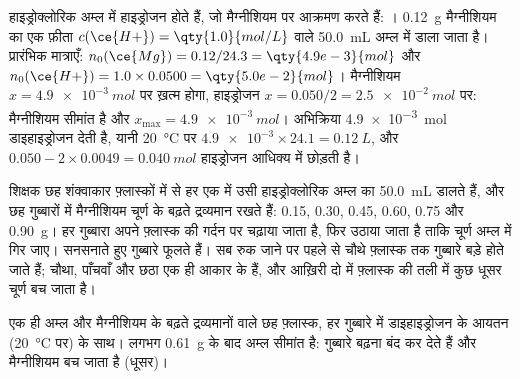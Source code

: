 \begin{example}[हाइड्रोक्लोरिक अम्ल में मैग्नीशियम]\label{ex:g10:reaction-progress-table:magnesium}
हाइड्रोक्लोरिक अम्ल में हाइड्रोजन   होते हैं, जो मैग्नीशियम पर आक्रमण करते हैं:
। \qty{0.12}{g} मैग्नीशियम का एक फ़ीता
$c(\ce{H+}) = \qty{1.0}{mol/L}$ वाले \qty{50.0}{mL} अम्ल में डाला जाता है।
प्रारंभिक मात्राएँ: $n_0(\ce{Mg}) = 0.12/24.3 = \qty{4.9e-3}{mol}$ और
$n_0(\ce{H+}) = 1.0 \times 0.0500 = \qty{5.0e-2}{mol}$। मैग्नीशियम
$x = \qty{4.9e-3}{mol}$ पर ख़त्म होगा, हाइड्रोजन 
$x = 0.050/2 = \qty{2.5e-2}{mol}$ पर: मैग्नीशियम सीमांत है और
$x_{\max} = \qty{4.9e-3}{mol}$। अभिक्रिया \qty{4.9e-3}{mol}
डाइहाइड्रोजन देती है, यानी \qty{20}{\celsius} पर $\num{4.9e-3} \times 24.1 = \qty{0.12}{L}$,
और $0.050 - 2 \times 0.0049 =
\qty{0.040}{mol}$ हाइड्रोजन  आधिक्य में छोड़ती है।
\end{example}

\begin{inthelab}[फ़्लास्कों पर गुब्बारे]
शिक्षक छह शंक्वाकार फ़्लास्कों में से हर एक में उसी हाइड्रोक्लोरिक अम्ल का
\qty{50.0}{mL} डालते हैं, और छह गुब्बारों में मैग्नीशियम चूर्ण के बढ़ते द्रव्यमान
रखते हैं: 0.15, 0.30, 0.45, 0.60, 0.75 और \qty{0.90}{g}। हर गुब्बारा
अपने फ़्लास्क की गर्दन पर चढ़ाया जाता है, फिर उठाया जाता है ताकि चूर्ण अम्ल में
गिर जाए। सनसनाते हुए गुब्बारे फूलते हैं। सब रुक जाने पर पहले से चौथे फ़्लास्क तक
गुब्बारे बड़े होते जाते हैं; चौथा, पाँचवाँ और छठा एक ही आकार के हैं, और आख़िरी
दो में फ़्लास्क की तली में कुछ धूसर चूर्ण बच जाता है।
\end{inthelab}

\begin{omfigure}

{\small एक ही अम्ल और मैग्नीशियम के बढ़ते द्रव्यमानों वाले छह फ़्लास्क, हर गुब्बारे में
डाइहाइड्रोजन के आयतन (\qty{20}{\celsius} पर) के साथ।
लगभग \qty{0.61}{g} के बाद अम्ल सीमांत है: गुब्बारे बढ़ना बंद कर देते हैं
और मैग्नीशियम बच जाता है (धूसर)।}
\end{omfigure}

